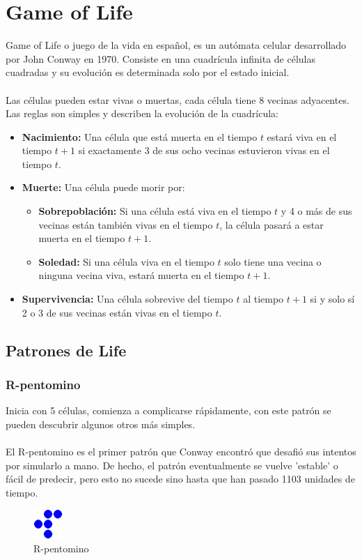 \chapter{Game of Life}

Game of Life o juego de la vida en español, es un autómata celular desarrollado por John Conway en 1970.
Consiste en una cuadrícula infinita de células cuadradas y su evolución es determinada solo por el estado inicial.\\\\
Las células pueden estar vivas o muertas, cada célula tiene 8 vecinas adyacentes.
\\
Las reglas son simples y describen la evolución de la cuadrícula:

\begin{itemize}
	\item \textbf{Nacimiento:} Una célula que está muerta en el tiempo $t$ estará viva en el tiempo $t+1$ si exactamente 3 de sus ocho vecinas estuvieron vivas en el tiempo $t$.
	\item \textbf{Muerte:} Una célula puede morir por:
		\begin{itemize}
			\item \textbf{Sobrepoblación:} Si una célula está viva en el tiempo $t$ y 4 o más de sus vecinas están también vivas en el tiempo $t$, la célula pasará a estar muerta en el tiempo $t+1$.
			\item \textbf{Soledad:} Si una célula viva en el tiempo $t$ solo tiene una vecina o ninguna vecina viva, estará muerta en el tiempo $t+1$.
		\end{itemize}
	\item \textbf{Supervivencia:} Una célula sobrevive del tiempo $t$ al tiempo $t+1$ si y solo sí 2 o 3 de sus vecinas están vivas en el tiempo $t$.
\end{itemize}
\newpage
\section{Patrones de Life}
\subsection{R-pentomino}
Inicia con 5 células, comienza a complicarse rápidamente, con este patrón se pueden descubrir algunos otros más simples.\\\\
El R-pentomino es el primer patrón que Conway encontró que desafió sus intentos por simularlo a mano. De hecho, el patrón eventualmente se vuelve 'estable' o fácil de predecir, pero esto no sucede sino hasta que han pasado 1103 unidades de tiempo. \cite{mitslides}
\begin{figure}[h]
	\centering
	\includegraphics[width=0.1\textwidth]{capitulo1/images/rp.png}
	\caption{R-pentomino}
	\label{fig:pentomino}
\end{figure}
